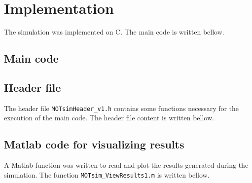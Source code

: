 \documentclass[12pt,a4paper,twoside]{article}
\begin{document}
\section{Implementation}

The simulation was implemented on C. The main code is written bellow.

\subsection{Main code}



\subsection{Header file}

The header file \verb|MOTsimHeader_v1.h| contains some functions necessary for the execution of the main code. The header file content is written bellow.



\subsection{Matlab code for visualizing results}

A Matlab function was written to read and plot the results generated during the simulation. The function \verb|MOTsim_ViewResults1.m| is written bellow.





\end{document}
